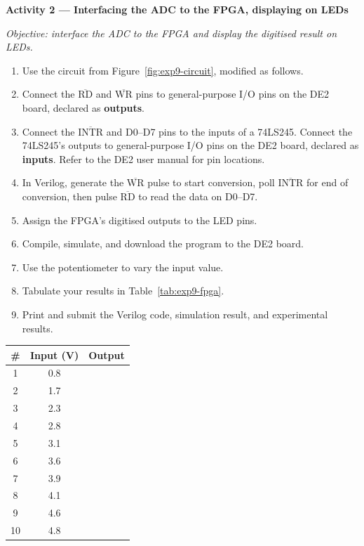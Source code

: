\begin{procedure}
  \textbf{Activity 2 --- Interfacing the ADC to the FPGA, displaying on LEDs}\vspace{2pt}

  \textit{Objective: interface the ADC to the FPGA and display the digitised result on LEDs.}

  \begin{enumerate}
    \item Use the circuit from Figure~\ref{fig:exp9-circuit}, modified as follows.
    \item Connect the $\overline{\text{RD}}$ and $\overline{\text{WR}}$ pins to general-purpose I/O pins on the DE2 board, declared as \textbf{outputs}.
    \item Connect the $\overline{\text{INTR}}$ and D0--D7 pins to the inputs of a 74LS245. Connect the 74LS245's outputs to general-purpose I/O pins on the DE2 board, declared as \textbf{inputs}. Refer to the DE2 user manual for pin locations.
    \item In Verilog, generate the $\overline{\text{WR}}$ pulse to start conversion, poll $\overline{\text{INTR}}$ for end of conversion, then pulse $\overline{\text{RD}}$ to read the data on D0--D7.
    \item Assign the FPGA's digitised outputs to the LED pins.
    \item Compile, simulate, and download the program to the DE2 board.
    \item Use the potentiometer to vary the input value.
    \item Tabulate your results in Table~\ref{tab:exp9-fpga}.
    \item Print and submit the Verilog code, simulation result, and experimental results.
  \end{enumerate}

  \needspace{4cm}
  \begin{boxedtable}
    \label{tab:exp9-fpga}
    {\renewcommand{\arraystretch}{1.5}
      \centering
      \begin{tabular}{cc c}
        \toprule
        \# & Input (V) & Output \\
        \midrule
        1  & 0.8       &        \\
        2  & 1.7       &        \\
        3  & 2.3       &        \\
        4  & 2.8       &        \\
        5  & 3.1       &        \\
        6  & 3.6       &        \\
        7  & 3.9       &        \\
        8  & 4.1       &        \\
        9  & 4.6       &        \\
        10 & 4.8       &        \\
        \bottomrule
      \end{tabular}
    }
  \end{boxedtable}
  \vspace*{1.5em}


\end{procedure}
